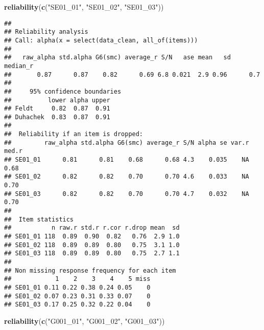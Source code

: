 \documentclass[
]{article}
\newenvironment{Shaded}{\begin{snugshade}}{\end{snugshade}}
\newcommand{\FunctionTok}[1]{\textcolor[rgb]{0.13,0.29,0.53}{\textbf{#1}}}
\newcommand{\NormalTok}[1]{#1}
\newcommand{\StringTok}[1]{\textcolor[rgb]{0.31,0.60,0.02}{#1}}
\begin{document}
\begin{Shaded}
\begin{Highlighting}[]
\FunctionTok{reliability}\NormalTok{(}\FunctionTok{c}\NormalTok{(}\StringTok{"SE01\_01"}\NormalTok{, }\StringTok{"SE01\_02"}\NormalTok{, }\StringTok{"SE01\_03"}\NormalTok{))}
\end{Highlighting}
\end{Shaded}

\begin{verbatim}
## 
## Reliability analysis   
## Call: alpha(x = select(data_clean, all_of(items)))
## 
##   raw_alpha std.alpha G6(smc) average_r S/N   ase mean   sd median_r
##       0.87      0.87    0.82      0.69 6.8 0.021  2.9 0.96      0.7
## 
##     95% confidence boundaries 
##          lower alpha upper
## Feldt     0.82  0.87  0.91
## Duhachek  0.83  0.87  0.91
## 
##  Reliability if an item is dropped:
##         raw_alpha std.alpha G6(smc) average_r S/N alpha se var.r med.r
## SE01_01      0.81      0.81    0.68      0.68 4.3    0.035    NA  0.68
## SE01_02      0.82      0.82    0.70      0.70 4.6    0.033    NA  0.70
## SE01_03      0.82      0.82    0.70      0.70 4.7    0.032    NA  0.70
## 
##  Item statistics 
##           n raw.r std.r r.cor r.drop mean  sd
## SE01_01 118  0.89  0.90  0.82   0.76  2.9 1.0
## SE01_02 118  0.89  0.89  0.80   0.75  3.1 1.0
## SE01_03 118  0.89  0.89  0.80   0.75  2.7 1.1
## 
## Non missing response frequency for each item
##            1    2    3    4    5 miss
## SE01_01 0.11 0.22 0.38 0.24 0.05    0
## SE01_02 0.07 0.23 0.31 0.33 0.07    0
## SE01_03 0.17 0.25 0.32 0.22 0.04    0
\end{verbatim}

\begin{Shaded}
\begin{Highlighting}[]
\FunctionTok{reliability}\NormalTok{(}\FunctionTok{c}\NormalTok{(}\StringTok{"G001\_01"}\NormalTok{, }\StringTok{"G001\_02"}\NormalTok{, }\StringTok{"G001\_03"}\NormalTok{))}
\end{Highlighting}
\end{Shaded}
\end{document}
